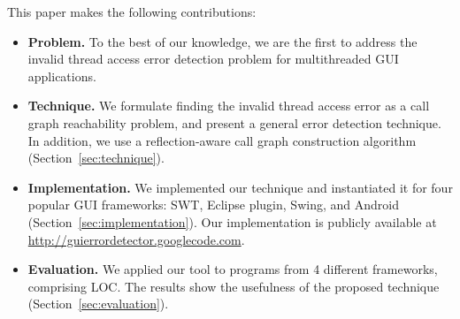 This paper makes the following contributions:

\vspace{-5pt}

\tinystep

\begin{itemize}
\item \textbf{Problem.} To the best of our knowledge, we are the first to address
the invalid thread access error detection problem for multithreaded GUI applications.

\tinystep

\item \textbf{Technique.} We formulate finding
the invalid thread access error as a call graph reachability problem,
and present a general error detection technique.
In addition, we use a reflection-aware
call graph construction algorithm (Section~\ref{sec:technique}).

\tinystep

\item \textbf{Implementation.} We implemented our technique and
instantiated it for four
popular GUI frameworks: SWT, Eclipse plugin, Swing, and Android (Section~\ref{sec:implementation}). Our
implementation is publicly available at
{\url{http://guierrordetector.googlecode.com}}.

\tinystep

\item \textbf{Evaluation.} We applied our tool to \subnum programs 
from 4 different frameworks, comprising \totaloc LOC. The results
show the usefulness of the proposed technique (Section~\ref{sec:evaluation}).

\end{itemize}

